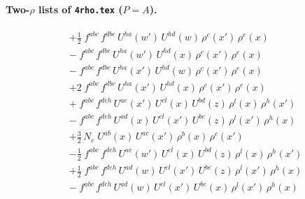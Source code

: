 \documentclass[10pt]{article}
\numberwithin{equation}{section}
\begin{document}
\paragraph{Two-$\rho$ lists of \texttt{4rho.tex} ($P=A$).}
\begin{align*}
&+\tfrac{1}{2}\;f^{abc}\,f^{dbe}\,U^{ha}(w')\,U^{hd}(w)\,\rho^{c}(x')\,\rho^{e}(x)\\&-\;f^{abc}\,f^{dbe}\,U^{ha}(w')\,U^{hd}(x)\,\rho^{c}(x')\,\rho^{e}(x)\\&-\;f^{abc}\,f^{dbe}\,U^{ha}(x')\,U^{hd}(w)\,\rho^{c}(x')\,\rho^{e}(x)\\&+2\;f^{abc}\,f^{dbe}\,U^{ha}(x')\,U^{hd}(x)\,\rho^{c}(x')\,\rho^{e}(x)\\&+\;f^{abc}\,f^{deh}\,U^{ae}(x')\,U^{cl}(x)\,U^{bd}(z)\,\rho^{l}(x)\,\rho^{h}(x')\\&-\;f^{abc}\,f^{deh}\,U^{ad}(x)\,U^{cl}(x')\,U^{be}(z)\,\rho^{l}(x')\,\rho^{h}(x)\\&+\tfrac{3}{2}\,N_c\;U^{ab}(x)\,U^{ac}(x')\,\rho^{b}(x)\,\rho^{c}(x')\\&-\tfrac{1}{2}\;f^{abc}\,f^{deh}\,U^{ae}(w')\,U^{cl}(x)\,U^{bd}(z)\,\rho^{l}(x)\,\rho^{h}(x')\\&+\tfrac{1}{2}\;f^{abc}\,f^{deh}\,U^{ad}(w)\,U^{cl}(x')\,U^{be}(z)\,\rho^{l}(x')\,\rho^{h}(x)\\&-\;f^{abc}\,f^{deh}\,U^{ad}(w)\,U^{cl}(x')\,U^{be}(x)\,\rho^{l}(x')\,\rho^{h}(x)
\end{align*}
\end{document}
